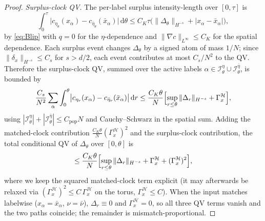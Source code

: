 \documentclass[a4paper,fleqn]{cas-sc}
\theoremstyle{definition}
\theoremstyle{remark}
\begin{document}
\begin{proof}
\emph{Surplus-clock QV.} The per-label surplus intensity-length over
$[0,\tau]$ is
\[
\int_0^\tau\bigl|c_{\eta_\theta}(x_\alpha)-c_{\bar\eta_\theta}(\bar x_\alpha)\bigr|\,\mathrm d\theta
\le C_K\tau\bigl(\|\Delta_\theta\|_{H^{-s}}+|x_\alpha-\bar x_\alpha|\bigr),
\]
by \eqref{eq:Blip} with $q=0$ for the $\eta$-dependence and
$\|\nabla c\|_{L^\infty}\le C_K$ for the spatial dependence. Each surplus event
changes $\Delta_\theta$ by a signed atom of mass $1/N$; since
$\|\delta_x\|_{H^{-s}}\le C_s$ for $s>d/2$, each event contributes at most
$C_s/N^2$ to the QV. Therefore the surplus-clock QV, summed over the active labels
$\alpha\in\mathcal I^\eta_\theta\cup\mathcal I^{\bar\eta}_\theta$, is bounded by
\[
\frac{C_s}{N^2}\sum_{\alpha}\int_0^\theta
\bigl|c_{\eta_r}(x_\alpha)-c_{\bar\eta_r}(\bar x_\alpha)\bigr|\,\mathrm dr
\le\frac{C_K\theta}{N}\Bigl[\sup_{r\le\theta}\|\Delta_r\|_{H^{-s}}+\Gamma_x^{\mathcal H}\Bigr],
\]
using $|\mathcal I^\eta_\theta|+|\mathcal I^{\bar\eta}_\theta|\le C_{\mathrm{pop}}N$ and
Cauchy--Schwarz in the spatial sum. Adding the matched-clock contribution
$\frac{C_K\theta}{N}(\Gamma_x^{\mathcal H})^2$ and the surplus-clock contribution,
the total conditional QV of $\Delta_\theta$ over $[0,\theta]$ is
\begin{equation}\label{eq:QV-total}
\le\frac{C_K\theta}{N}\Bigl[\sup_{r\le\theta}\|\Delta_r\|_{H^{-s}}
+\Gamma_x^{\mathcal H}+(\Gamma_x^{\mathcal H})^2\Bigr],
\end{equation}
where we keep the squared matched-clock term explicit (it may afterwards be
relaxed via $(\Gamma_x^{\mathcal H})^2\le C\,\Gamma_x^{\mathcal H}$ on the torus,
$\Gamma_x^{\mathcal H}\le C$).
When the input matches labelwise ($x_\alpha=\bar x_\alpha$, $\nu=\bar\nu$),
$\Delta_r\equiv0$ and $\Gamma_x^{\mathcal H}=0$, so all three QV terms vanish and the
two paths coincide; the remainder is mismatch-proportional.


\end{proof}
\end{document}

